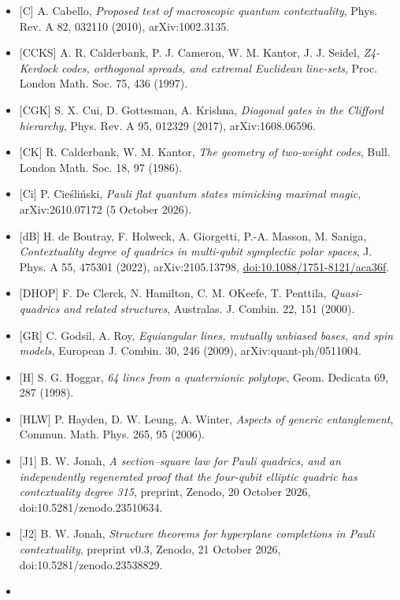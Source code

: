 \documentclass[11pt,a4paper]{article}
\providecommand{\tightlist}{\setlength{\itemsep}{0pt}\setlength{\parskip}{0pt}}
\begin{document}
\begin{itemize}
\tightlist
\item
  {[}C{]} A. Cabello, \emph{Proposed test of macroscopic quantum contextuality}, Phys. Rev. A 82, 032110 (2010), arXiv:1002.3135.
\item
  {[}CCKS{]} A. R. Calderbank, P. J. Cameron, W. M. Kantor, J. J. Seidel, \emph{Z4-Kerdock codes, orthogonal spreads, and extremal Euclidean line-sets}, Proc. London Math. Soc. 75, 436 (1997).
\item
  {[}CGK{]} S. X. Cui, D. Gottesman, A. Krishna, \emph{Diagonal gates in the Clifford hierarchy}, Phys. Rev. A 95, 012329 (2017), arXiv:1608.06596.
\item
  {[}CK{]} R. Calderbank, W. M. Kantor, \emph{The geometry of two-weight codes}, Bull. London Math. Soc. 18, 97 (1986).
\item
  {[}Ci{]} P. Cieśliński, \emph{Pauli flat quantum states mimicking maximal magic}, arXiv:2610.07172 (5 October 2026).
\item
  {[}dB{]} H. de Boutray, F. Holweck, A. Giorgetti, P.-A. Masson, M. Saniga, \emph{Contextuality degree of quadrics in multi-qubit symplectic polar spaces}, J. Phys. A 55, 475301 (2022), arXiv:2105.13798, \href{https://doi.org/10.1088/1751-8121/aca36f}{doi:10.1088/1751-8121/aca36f}.
\item
  {[}DHOP{]} F. De Clerck, N. Hamilton, C. M. O\textquotesingle Keefe, T. Penttila, \emph{Quasi-quadrics and related structures}, Australas. J. Combin. 22, 151 (2000).
\item
  {[}GR{]} C. Godsil, A. Roy, \emph{Equiangular lines, mutually unbiased bases, and spin models}, European J. Combin. 30, 246 (2009), arXiv:quant-ph/0511004.
\item
  {[}H{]} S. G. Hoggar, \emph{64 lines from a quaternionic polytope}, Geom. Dedicata 69, 287 (1998).
\item
  {[}HLW{]} P. Hayden, D. W. Leung, A. Winter, \emph{Aspects of generic entanglement}, Commun. Math. Phys. 265, 95 (2006).
\item
  {[}J1{]} B. W. Jonah, \emph{A section--square law for Pauli quadrics, and an independently regenerated proof that the four-qubit elliptic quadric has contextuality degree 315}, preprint, Zenodo, 20 October 2026, doi:10.5281/zenodo.23510634.
\item
  {[}J2{]} B. W. Jonah, \emph{Structure theorems for hyperplane completions in Pauli contextuality}, preprint v0.3, Zenodo, 21 October 2026, doi:10.5281/zenodo.23538829.
\item

\end{itemize}
\end{document}
